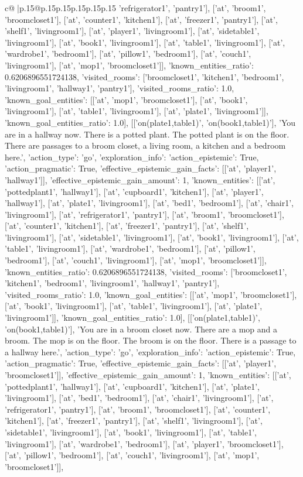 \documentclass{article}
\begin{document}
{\begin{supertabular}{c@{$\;$}|p{.15\linewidth}@{}p{.15\linewidth}p{.15\linewidth}p{.15\linewidth}p{.15\linewidth}p{.15\linewidth}}
{{{'refrigerator1', 'pantry1'], ['at', 'broom1', 'broomcloset1'], ['at', 'counter1', 'kitchen1'], ['at', 'freezer1', 'pantry1'], ['at', 'shelf1', 'livingroom1'], ['at', 'player1', 'livingroom1'], ['at', 'sidetable1', 'livingroom1'], ['at', 'book1', 'livingroom1'], ['at', 'table1', 'livingroom1'], ['at', 'wardrobe1', 'bedroom1'], ['at', 'pillow1', 'bedroom1'], ['at', 'couch1', 'livingroom1'], ['at', 'mop1', 'broomcloset1']], 'known_entities_ratio': 0.6206896551724138, 'visited_rooms': ['broomcloset1', 'kitchen1', 'bedroom1', 'livingroom1', 'hallway1', 'pantry1'], 'visited_rooms_ratio': 1.0, 'known_goal_entities': [['at', 'mop1', 'broomcloset1'], ['at', 'book1', 'livingroom1'], ['at', 'table1', 'livingroom1'], ['at', 'plate1', 'livingroom1']], 'known_goal_entities_ratio': 1.0}}], [['on(plate1,table1)', 'on(book1,table1)'], 'You are in a hallway now. There is a potted plant. The potted plant is on the floor. There are passages to a broom closet, a living room, a kitchen and a bedroom here.', {'action_type': 'go', 'exploration_info': {'action_epistemic': True, 'action_pragmatic': True, 'effective_epistemic_gain_facts': [['at', 'player1', 'hallway1']], 'effective_epistemic_gain_amount': 1, 'known_entities': [['at', 'pottedplant1', 'hallway1'], ['at', 'cupboard1', 'kitchen1'], ['at', 'player1', 'hallway1'], ['at', 'plate1', 'livingroom1'], ['at', 'bed1', 'bedroom1'], ['at', 'chair1', 'livingroom1'], ['at', 'refrigerator1', 'pantry1'], ['at', 'broom1', 'broomcloset1'], ['at', 'counter1', 'kitchen1'], ['at', 'freezer1', 'pantry1'], ['at', 'shelf1', 'livingroom1'], ['at', 'sidetable1', 'livingroom1'], ['at', 'book1', 'livingroom1'], ['at', 'table1', 'livingroom1'], ['at', 'wardrobe1', 'bedroom1'], ['at', 'pillow1', 'bedroom1'], ['at', 'couch1', 'livingroom1'], ['at', 'mop1', 'broomcloset1']], 'known_entities_ratio': 0.6206896551724138, 'visited_rooms': ['broomcloset1', 'kitchen1', 'bedroom1', 'livingroom1', 'hallway1', 'pantry1'], 'visited_rooms_ratio': 1.0, 'known_goal_entities': [['at', 'mop1', 'broomcloset1'], ['at', 'book1', 'livingroom1'], ['at', 'table1', 'livingroom1'], ['at', 'plate1', 'livingroom1']], 'known_goal_entities_ratio': 1.0}}], [['on(plate1,table1)', 'on(book1,table1)'], 'You are in a broom closet now. There are a mop and a broom. The mop is on the floor. The broom is on the floor. There is a passage to a hallway here.', {'action_type': 'go', 'exploration_info': {'action_epistemic': True, 'action_pragmatic': True, 'effective_epistemic_gain_facts': [['at', 'player1', 'broomcloset1']], 'effective_epistemic_gain_amount': 1, 'known_entities': [['at', 'pottedplant1', 'hallway1'], ['at', 'cupboard1', 'kitchen1'], ['at', 'plate1', 'livingroom1'], ['at', 'bed1', 'bedroom1'], ['at', 'chair1', 'livingroom1'], ['at', 'refrigerator1', 'pantry1'], ['at', 'broom1', 'broomcloset1'], ['at', 'counter1', 'kitchen1'], ['at', 'freezer1', 'pantry1'], ['at', 'shelf1', 'livingroom1'], ['at', 'sidetable1', 'livingroom1'], ['at', 'book1', 'livingroom1'], ['at', 'table1', 'livingroom1'], ['at', 'wardrobe1', 'bedroom1'], ['at', 'player1', 'broomcloset1'], ['at', 'pillow1', 'bedroom1'], ['at', 'couch1', 'livingroom1'], ['at', 'mop1', 'broomcloset1']], }}}
\end{supertabular}}
\end{document}
